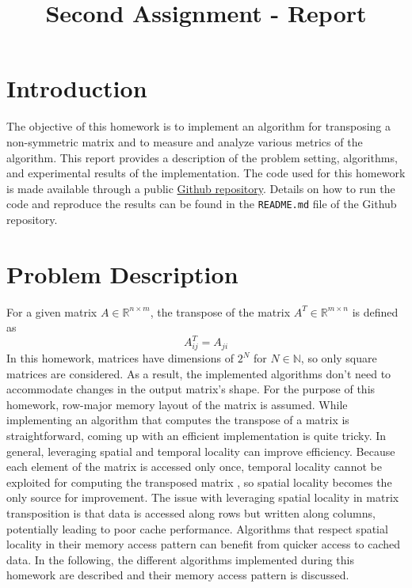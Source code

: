 \documentclass[conference]{IEEEtran}
\begin{document}
    \title{Second Assignment - Report}
    \author{
    }
    \maketitle
    \thispagestyle{plain}
    \pagestyle{plain}

    \setcounter{page}{1}

    \section{Introduction}    
    The objective of this homework is to implement an algorithm for transposing a non-symmetric matrix and to measure and analyze various metrics of the algorithm. This report provides a description of the problem setting, algorithms, and experimental results of the implementation.
    The code used for this homework is made available through a public \href{https://github.com/chrisdalvit/gpu-matrix-transpose-benchmark}{Github repository}. Details on how to run the code and reproduce the results can be found in the \texttt{README.md} file of the Github repository.

    \section{Problem Description}
    For a given matrix $A \in \mathbb{R}^{n \times m}$, the transpose of the matrix $A^T \in \mathbb{R}^{m \times n}$ is defined as
    $$
        A^T_{ij} = A_{ji}
    $$
    In this homework, matrices have dimensions of $2^N$ for $N \in \mathbb{N}$, so only square matrices are considered. As a result, the implemented algorithms don't need to accommodate changes in the output matrix's shape. For the purpose of this homework, row-major memory layout of the matrix is assumed.
    While implementing an algorithm that computes the transpose of a matrix is straightforward, coming up with an efficient implementation is quite tricky. In general, leveraging spatial and temporal locality can improve efficiency. Because each element of the matrix is accessed only once, temporal locality cannot be exploited for computing the transposed matrix \cite{chatterjee2000cache}, so spatial locality becomes the only source for improvement. The issue with leveraging spatial locality in matrix transposition is that data is accessed along rows but written along columns, potentially leading to poor cache performance. Algorithms that respect spatial locality in their memory access pattern can benefit from quicker access to cached data. In the following, the different algorithms implemented during this homework are described and their memory access pattern is discussed.
\end{document}
